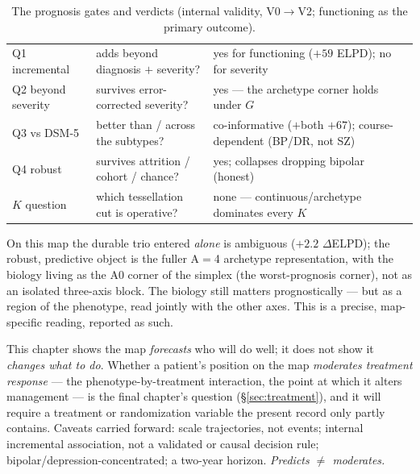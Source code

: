\begin{table}[h]\centering\small\sffamily
\caption{The prognosis gates and verdicts (internal validity, V0$\to$V2; functioning as the primary outcome).}
\label{tab:m4goals}
\begin{tabular}{L{2.1cm} L{5.3cm} L{5.4cm}}
\toprule
{} &  & \\
\midrule
{} Q1 incremental & adds beyond diagnosis $+$ severity? & yes for functioning ($+59$ ELPD); no for severity\\
Q2 beyond severity & survives error-corrected severity? & yes --- the archetype corner holds under $G$\\
 Q3 vs DSM-5 & better than / across the subtypes? & co-informative ($+$both $+67$); course-dependent (BP/DR, not SZ)\\
Q4 robust & survives attrition / cohort / chance? & yes; collapses dropping bipolar (honest)\\
 $K$ question & which tessellation cut is operative? & none --- continuous/archetype dominates every $K$\\
\bottomrule
\end{tabular}
\end{table}

\begin{caveatbox}
On this map the durable trio entered \emph{alone} is ambiguous ($+2.2$ $\Delta$ELPD); the robust,
predictive object is the fuller A$=$4 archetype representation, with the biology living as the A0 corner of
the simplex (the worst-prognosis corner), not as an isolated three-axis block. The biology still matters
prognostically --- but as a region of the phenotype, read jointly with the other axes. This is a precise,
map-specific reading, reported as such.
\end{caveatbox}

\begin{openbox}
This chapter shows the map \emph{forecasts} who will do well; it does not show it \emph{changes what to do}.
Whether a patient's position on the map \emph{moderates treatment response} --- the phenotype-by-treatment
interaction, the point at which it alters management --- is the final chapter's question (\S\ref{sec:treatment}), and it
will require a treatment or randomization variable the present record only partly contains. Caveats carried
forward: scale trajectories, not events; internal incremental association, not a validated or causal
decision rule; bipolar/depression-concentrated; a two-year horizon. \emph{Predicts $\ne$ moderates.}
\end{openbox}

